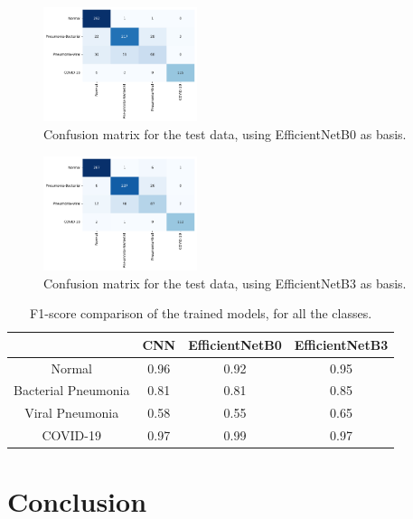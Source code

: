 \documentclass[conference]{IEEEtran}
\begin{document}
\begin{figure}[htp]
    \centering
    \includegraphics[width=0.4\textwidth]{imgs/EfficientNetB0_confusion.pdf}
    \caption{Confusion matrix for the test data, using EfficientNetB0 as basis.}
    \label{fig:b0_confusion}
\end{figure}

\begin{figure}[htp]
    \centering
    \includegraphics[width=0.4\textwidth]{imgs/EfficientNetB3_confusion.pdf}
    \caption{Confusion matrix for the test data, using EfficientNetB3 as basis.}
    \label{fig:b3_confusion}
\end{figure}

\begin{table}[htp]
\centering
\caption{F1-score comparison of the trained models, for all the classes.}
\label{tab:f1_comparison}
\begin{tabular}{cccc}
                    & CNN & EfficientNetB0 & EfficientNetB3 \\ \hline
Normal              & 0.96 & 0.92           & 0.95           \\
Bacterial Pneumonia  & 0.81 & 0.81           & 0.85           \\
Viral Pneumonia      & 0.58 & 0.55           & 0.65           \\
COVID-19            & 0.97 & 0.99           & 0.97          
\end{tabular}
\end{table}

\section{Conclusion}
\end{document}

